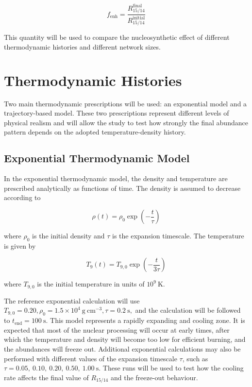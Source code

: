 \begin{equation}
    f_{\mathrm{enh}} =
\frac{R_{15/14}^{\mathrm{final}}}
{R_{15/14}^{\mathrm{initial}}}
\end{equation}

This quantity will be used to compare the nucleosynthetic effect of different thermodynamic histories and different network sizes.

\section{Thermodynamic Histories}

Two main thermodynamic prescriptions will be used: an exponential model and a trajectory-based model. These two prescriptions represent different levels of physical realism and will allow the study to test how strongly the final abundance pattern depends on the adopted temperature-density history.

\subsection{Exponential Thermodynamic Model}

In the exponential thermodynamic model, the density and temperature are prescribed analytically as functions of time. The density is assumed to decrease according to

\begin{equation}
    \rho(t)=\rho_0 \exp\left(-\frac{t}{\tau}\right)
\end{equation}

where $\rho_0$ is the initial density and $\tau$ is the expansion timescale. The temperature is given by

\begin{equation}
T_9(t)=T_{9,0}\exp\left(-\frac{t}{3\tau}\right)
\end{equation}

where $T_{9,0}$ is the initial temperature in units of $10^9~\mathrm{K}$.

The reference exponential calculation will use $T_{9,0}=0.20, \rho_0 = 1.5\times10^4~\mathrm{g~cm^{-3}}, \tau = 0.2~\mathrm{s},$ and the calculation will be followed to $ t_{\mathrm{end}} = 100~\mathrm{s}$. This model represents a rapidly expanding and cooling zone. It is expected that most of the nuclear processing will occur at early times, after which the temperature and density will become too low for efficient burning, and the abundances will freeze out.
Additional exponential calculations may also be performed with different values of the expansion timescale $\tau$, such as $\tau = 0.05,\ 0.10,\ 0.20,\ 0.50,\ 1.00~\mathrm{s}$. These runs will be used to test how the cooling rate affects the final value of $R_{15/14}$ and the freeze-out behaviour.

